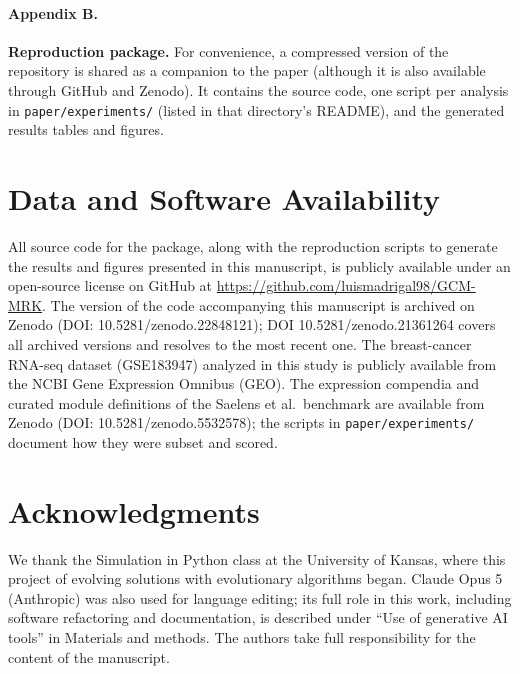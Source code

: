 \paragraph*{Appendix B.}
\textbf{Reproduction package.} For convenience, a compressed version of the repository is shared as a companion to the paper (although it is also available through GitHub and Zenodo). It contains the source code, one script per analysis in \texttt{paper/experiments/} (listed in that directory's README), and the generated results tables and figures.

\section*{Data and Software Availability}
All source code for the \tool{} package, along with the reproduction scripts to generate the results and figures presented in this manuscript, is publicly available under an open-source license on GitHub at \url{https://github.com/luismadrigal98/GCM-MRK}. The version of the code accompanying this manuscript is archived on Zenodo (DOI: 10.5281/zenodo.22848121); DOI 10.5281/zenodo.21361264 covers all archived versions and resolves to the most recent one. The breast-cancer RNA-seq dataset (GSE183947) analyzed in this study is publicly available from the NCBI Gene Expression Omnibus (GEO). The expression compendia and curated module definitions of the Saelens et al.\ benchmark are available from Zenodo (DOI: 10.5281/zenodo.5532578); the scripts in \texttt{paper/experiments/} document how they were subset and scored.

\section*{Acknowledgments}
We thank the Simulation in Python class at the University of Kansas, where this project of evolving solutions with evolutionary algorithms began. Claude Opus 5 (Anthropic) was also used for language editing; its full role in this work, including software refactoring and documentation, is described under ``Use of generative AI tools'' in Materials and methods. The authors take full responsibility for the content of the manuscript.
